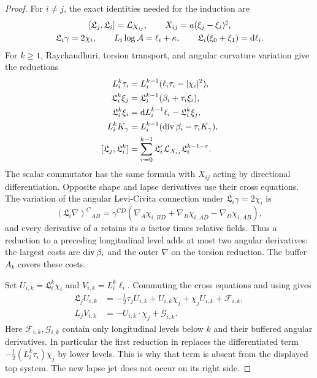 \begin{proof}
For $i\ne j$, the exact identities needed for the induction are
\begin{equation}\label{dn:longitudinal-identities}
\begin{gathered}
 [\mathfrak L_j,\mathfrak L_i]
       =\Lie_{X_{ij}},\qquad X_{ij}=a(\xi_j-\xi_i)^\sharp,\\
 \mathfrak L_i\gamma=2\chi_i,\qquad
 L_i\log\mathcal A=\ell_i+\kappa,\qquad
 \mathfrak L_i(\xi_0+\xi_1)=\dd\ell_i .
\end{gathered}
\end{equation}
For $k\ge1$, Raychaudhuri, torsion transport, and angular curvature
variation give the reductions
\begin{equation}\label{dn:longitudinal-reductions}
\begin{aligned}
 L_i^k\tau_i
   &=L_i^{k-1}(\ell_i\tau_i-|\chi_i|^2),\\
 \mathfrak L_i^k\xi_j
   &=\mathfrak L_i^{k-1}(\beta_i+\tau_i\xi_i),\\
 \mathfrak L_i^k\xi_i
   &=\mathrm d L_i^{k-1}\ell_i-\mathfrak L_i^k\xi_j,\\
 L_i^kK_\gamma
   &=L_i^{k-1}(\operatorname{div}\beta_i-\tau_iK_\gamma),\\
 [\mathfrak L_j,\mathfrak L_i^k]
   &=\sum_{r=0}^{k-1}
       \mathfrak L_i^r\mathcal L_{X_{ij}}\mathfrak L_i^{k-1-r}.
\end{aligned}
\end{equation}
The scalar commutator has the same formula with $X_{ij}$ acting by
directional differentiation.  Opposite shape and lapse derivatives
use their cross equations.  The variation of the angular Levi-Civita
connection under $\mathfrak L_i\gamma=2\chi_i$ is
\[
 (\mathfrak L_i\nabla)^C{}_{AB}
 =\gamma^{CD}
   (\nabla_A\chi_{i,BD}+\nabla_B\chi_{i,AD}
                                      -\nabla_D\chi_{i,AB}),
\]
and every derivative of $a$ retains its $a$ factor times relative
fields.  Thus a reduction to a preceding longitudinal level adds at
most two angular derivatives: the largest costs are $\operatorname{div}\beta_i$
and the outer $\nabla$ on the torsion reduction.  The buffer $A_k$
covers these costs.

Set $U_{i,k}=\mathfrak L_i^k\chi_i$ and $V_{i,k}=L_i^k\ell_i$.
Commuting the cross equations and using
 gives
\begin{equation}\label{dn:pure-top-system}
\begin{aligned}
 \mathfrak L_jU_{i,k}
   &=-\tfrac12\tau_jU_{i,k}
       +U_{i,k}\chi_j+\chi_jU_{i,k}+\mathcal F_{i,k},\\
 L_jV_{i,k}
   &=-U_{i,k}\cdot\chi_j+\mathcal G_{i,k}.
\end{aligned}
\end{equation}
Here $\mathcal F_{i,k},\mathcal G_{i,k}$ contain only longitudinal
levels below $k$ and their buffered angular derivatives.  In
particular the first reduction in
 replaces the differentiated term
$-\tfrac12(L_i^k\tau_i)\chi_j$ by lower levels.  This is why that
term is absent from the displayed top system.  The new lapse jet
does not occur on its right side.


\end{proof}

